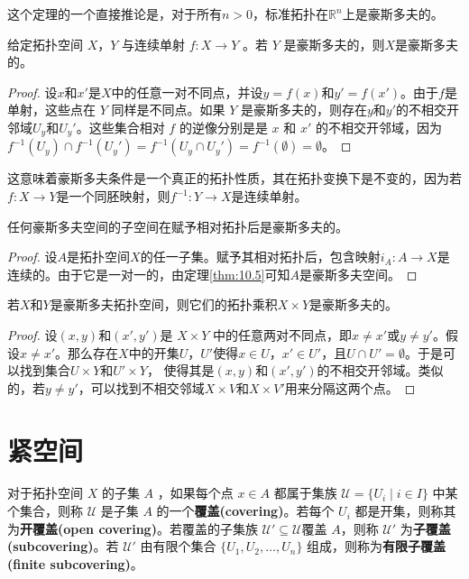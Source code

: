 这个定理的一个直接推论是，对于所有$n >0$，标准拓扑在$\mathbb{R}^{n}$上是豪斯多夫的。

\begin{theorem}\label{eg:10.5}
	给定拓扑空间 $X$，$Y$ 与连续单射 $f:X\rightarrow Y$ 。若 $Y$ 是豪斯多夫的，则$X$是豪斯多夫的。
\end{theorem}

\begin{proof}
	设$x$和$x'$是$X$中的任意一对不同点，并设$y=f(x)$和$y'=f(x')$。由于$f$是单射，这些点在 $Y$ 同样是不同点。如果 $Y$ 是豪斯多夫的，则存在$y$和$y'$的不相交开邻域$U_{y}$和$U_{y} '$。这些集合相对 $f$ 的逆像分别是是 $x$ 和 $x'$ 的不相交开邻域，因为$f^{-1} (U_{y} )\cap f^{-1} (U_{y} ')=f^{-1} (U_{y} \cap U_{y} ')=f^{-1} (\emptyset )=\emptyset $。
\end{proof}

	这意味着豪斯多夫条件是一个真正的拓扑性质，其在拓扑变换下是不变的，因为若$f:X\rightarrow Y$是一个同胚映射，则$f^{-1} :Y\rightarrow X$是连续单射。

\begin{corollary}\label{eg:10.6}
	任何豪斯多夫空间的子空间在赋予相对拓扑后是豪斯多夫的。
\end{corollary}

\begin{proof}
	设$A$是拓扑空间$X$的任一子集。赋予其相对拓扑后，包含映射$i_{A} :A\rightarrow X$是连续的。由于它是一对一的，由定理\ref{thm:10.5}可知$A$是豪斯多夫空间。
\end{proof}

\begin{theorem}\label{eg:10.7}
	若$X$和$Y$是豪斯多夫拓扑空间，则它们的拓扑乘积$X\times Y$是豪斯多夫的。
\end{theorem}

\begin{proof}
	设$(x,y)$和$(x',y')$是 $X\times Y$ 中的任意两对不同点，即$x\neq x'$或$y\neq y'$。假设$x\neq x'$。那么存在$X$中的开集$U$，$U'$使得$x\in U$，$x'\in U'$，且$U\cap U'=\emptyset $。于是可以找到集合$U\times Y$和$U'\times Y$， 使得其是$(x,y)$和$(x',y')$的不相交开邻域。类似的，若$y\neq y'$，可以找到不相交邻域$X\times V$和$X\times V'$用来分隔这两个点。
\end{proof}

\section{紧空间}

对于拓扑空间 $X$ 的子集 $A$ ，如果每个点 $x\in A$ 都属于集族 $\mathcal{U} =\{U_{i} \mid i\in I\}$ 中某个集合，则称 $\mathcal{U}$ 是子集 $A$ 的一个\textbf{覆盖(covering)}。若每个 $U_{i}$ 都是开集，则称其为\textbf{开覆盖(open covering)}。若覆盖的子集族 $\mathcal{U} '\subseteq \mathcal{U}$覆盖 $A$，则称 $\mathcal{U} '$ 为\textbf{子覆盖(subcovering)}。若 $\mathcal{U} '$ 由有限个集合 $\{U_{1} ,U_{2} ,\dotsc ,U_{n} \}$ 组成，则称为\textbf{有限子覆盖(finite subcovering)}。

